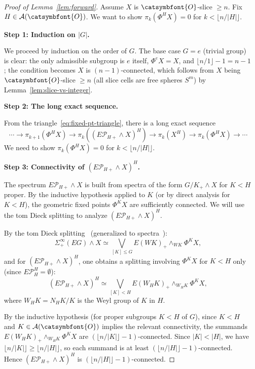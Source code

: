 \documentclass[12pt]{article}
\newcommand{\aO}{{\catsymbfont{O}}}
\theoremstyle{definition}
\begin{document}
\begin{proof}[Proof of Lemma~\ref{lem:forward}]
Assume $X$ is $\aO$-slice $\geq n$.  Fix $H\in\mathcal{A}(\aO)$.  We want to show $\pi_k(\Phi^H X) = 0$ for $k < \lfloor n/|H|\rfloor$.

\medskip
\noindent\textbf{Step 1: Induction on $|G|$.}

We proceed by induction on the order of $G$.  The base case $G = e$ (trivial group) is clear: the only admissible subgroup is $e$ itself, $\Phi^e X = X$, and $\lfloor n/1\rfloor - 1 = n-1$; the condition becomes $X$ is $(n-1)$-connected, which follows from $X$ being $\aO$-slice $\geq n$ (all slice cells are free spheres $S^m$) by Lemma~\ref{lem:slice-vs-integer}.

\medskip
\noindent\textbf{Step 2: The long exact sequence.}

From the triangle~\eqref{eq:fixed-pt-triangle}, there is a long exact sequence
\[
   \cdots \to \pi_{k+1}(\Phi^H X) \to \pi_k((E\mathcal{P}_{H+}\wedge X)^H) \to \pi_k(X^H) \to \pi_k(\Phi^H X) \to \cdots
\]
We need to show $\pi_k(\Phi^H X) = 0$ for $k < \lfloor n/|H|\rfloor$.

\medskip
\noindent\textbf{Step 3: Connectivity of $(E\mathcal{P}_{H+}\wedge X)^H$.}

The spectrum $E\mathcal{P}_{H+}\wedge X$ is built from spectra of the form $G/K_+\wedge X$ for $K < H$ proper.  By the inductive hypothesis applied to $K$ (or by direct analysis for $K < H$), the geometric fixed points $\Phi^K X$ are sufficiently connected.  We will use the tom Dieck splitting to analyze $(E\mathcal{P}_{H+}\wedge X)^H$.

By the tom Dieck splitting~\cite[V.11.1]{LMS} (generalized to spectra~\cite[XVI.5.4]{LMS}):
\[
   \Sigma^\infty_+(EG) \wedge X \simeq \bigvee_{[K]\leq G} E(WK)_+\wedge_{WK} \Phi^K X,
\]
and for $(E\mathcal{P}_{H+}\wedge X)^H$, one obtains a splitting involving $\Phi^K X$ for $K < H$ only (since $E\mathcal{P}_H^H = \emptyset$):
\[
   (E\mathcal{P}_{H+}\wedge X)^H \simeq \bigvee_{[K] < H} E(W_H K)_+\wedge_{W_H K} \Phi^K X,
\]
where $W_H K = N_H K / K$ is the Weyl group of $K$ in $H$.

By the inductive hypothesis (for proper subgroups $K < H$ of $G$), since $K < H$ and $K\in\mathcal{A}(\aO)$ implies the relevant connectivity, the summands $E(W_H K)_+\wedge_{W_H K}\Phi^K X$ are $({\lfloor n/|K|\rfloor - 1})$-connected.  Since $|K| < |H|$, we have $\lfloor n/|K|\rfloor \geq \lfloor n/|H|\rfloor$, so each summand is at least $(\lfloor n/|H|\rfloor - 1)$-connected.  Hence $(E\mathcal{P}_{H+}\wedge X)^H$ is $(\lfloor n/|H|\rfloor - 1)$-connected.


\end{proof}
\end{document}
